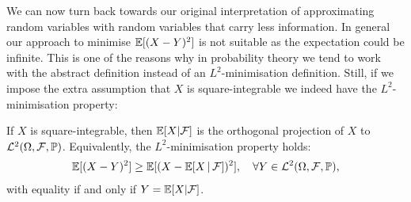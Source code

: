 We can now turn back towards our original interpretation of approximating random variables with random variables that carry less information. In general our approach to minimise $\E[(X-Y)^2]$ is not suitable as the expectation could be infinite. This is one of the reasons why in probability theory we tend to work with the abstract definition instead of an $L^2$-minimisation definition. Still, if we impose the extra assumption that $X$ is square-integrable we indeed have the $L^2$-minimisation property:
\begin{lsatz}
\begin{theorem}
	If $X$ is square-integrable, then $\mathbb E[X|\cF]$ is the orthogonal projection of $X$ to $\mathcal L^2(\Omega, \mathcal F, \P)$. Equivalently, the $L^2$-minimisation property holds:
	\begin{align*}
		\mathbb E[(X-Y)^2] \geq \mathbb E[(X-\mathbb E[X\,|\,\cF])^2],\quad \forall Y\in \mathcal L^2(\Omega, \mathcal F, \mathbb P),
	\end{align*}
	with equality if and only if $Y = \mathbb E[X|\cF]$.
\end{theorem}
\end{lsatz}
